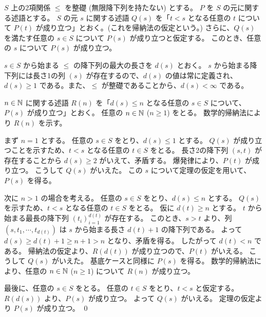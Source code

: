 \begin{jtheorem}[整礎帰納法]
  $S$ 上の2項関係 $\leq$ を整礎 (無限降下列を持たない) とする。
  $P$ を $S$ の元に関する述語とする。
  $S$ の元 $s$ に関する述語 $Q(s)$ を「$t < s$ となる任意の $t$ について $P(t)$ が成り立つ」とおく。(これを帰納法の仮定という。)
  さらに、$Q(s)$ を満たす任意の $s \in S$ について $P(s)$ が成り立つと仮定する。
  このとき、任意の $s$ について $P(s)$ が成り立つ。
\end{jtheorem}
\begin{jproof}
  $s \in S$ から始まる $\leq$ の降下列の最大の長さを $d(s)$ とおく。
  $s$ から始まる降下列には長さ1の列 $(s)$ が存在するので、$d(s)$ の値は常に定義され、$d(s) \geq 1$ である。また、$\leq$ が整礎であることから、$d(s) < \infty$ である。

  $n \in \mathbb{N}$ に関する述語 $R(n)$ を「$d(s) \leq n$ となる任意の $s \in S$ について、$P(s)$ が成り立つ」とおく。
  任意の $n \in \mathbb{N}$ ($n \geq 1$) をとる。
  数学的帰納法により $R(n)$ を示す。

  まず $n = 1$ とする。
  任意の $s \in S$ をとり、$d(s) \leq 1$ とする。
  $Q(s)$ が成り立つことを示すため、$t < s$ となる任意の $t \in S$ をとる。
  長さ2の降下列 $(s, t)$ が存在することから $d(s) \geq 2$ がいえて、矛盾する。
  爆発律により、$P(t)$ が成り立つ。
  こうして $Q(s)$ がいえた。
  この $s$ について定理の仮定を用いて、$P(s)$ を得る。

  次に $n > 1$ の場合を考える。
  任意の $s \in S$ をとり、$d(s) \leq n$ とする。
  $Q(s)$ を示すため、$t < s$ となる任意の $t \in S$ をとる。
  仮に $d(t) \geq n$ とする。
  $t$ から始まる最長の降下列 $(t_i)_{i=1}^{d(t)}$ が存在する。
  このとき、$s > t$ より、列 $(s, t_1, \cdots, t_{d(t)})$ は $s$ から始まる長さ $d(t) + 1$ の降下列である。
  よって $d(s) \geq d(t) + 1 \geq n + 1 > n$ となり、矛盾を得る。
  したがって $d(t) < n$ である。
  帰納法の仮定より、$R(d(t))$ が成り立つので、$P(t)$ がいえる。
  こうして $Q(s)$ がいえた。
  基底ケースと同様に $P(s)$ を得る。
  数学的帰納法により、任意の $n \in \mathbb{N}$ ($n \geq 1$) について $R(n)$ が成り立つ。

  最後に、任意の $s \in S$ をとる。
  任意の $t \in S$ をとり、$t < s$ と仮定する。
  $R(d(s))$ より、$P(s)$ が成り立つ。
  よって $Q(s)$ がいえる。
  定理の仮定より $P(s)$ が成り立つ。
  \qed
\end{jproof}

